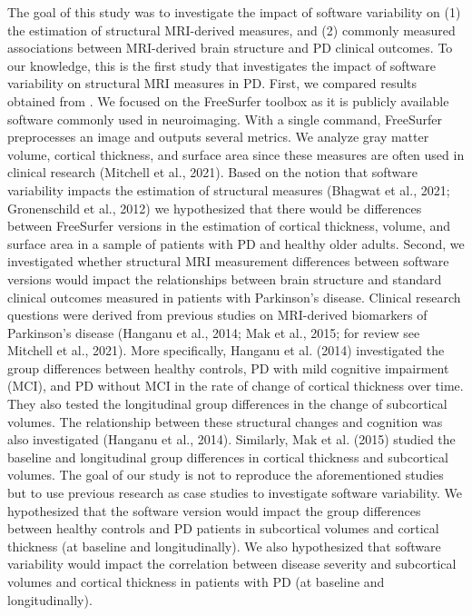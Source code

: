\documentclass[11pt]{article}
\begin{document}
The goal of this study was to investigate the impact of software variability on (1) the estimation of structural
MRI-derived measures, and (2) commonly measured associations between MRI-derived brain structure and PD clinical
outcomes. To our knowledge, this is the first study that investigates the impact of software variability on
structural MRI measures in PD. First, we compared results obtained from . We focused on the FreeSurfer toolbox as it is publicly available software commonly
used in neuroimaging. With a single command, FreeSurfer preprocesses an image and outputs several metrics. We
analyze gray matter volume, cortical thickness, and surface area since these measures are often used in clinical
research (Mitchell et al., 2021). Based on the notion that software variability impacts the estimation of
structural measures (Bhagwat et al., 2021; Gronenschild et al., 2012) we hypothesized that there would be
differences between FreeSurfer versions in the estimation of cortical thickness, volume, and surface area in a
sample of patients with PD and healthy older adults. Second, we investigated whether structural MRI measurement
differences between software versions would impact the relationships between brain structure and standard
clinical outcomes measured in patients with Parkinson's disease. Clinical research questions were derived from
previous studies on MRI-derived biomarkers of Parkinson's disease (Hanganu et al., 2014; Mak et al., 2015; for
review see Mitchell et al., 2021). More specifically, Hanganu et al. (2014) investigated the group differences
between healthy controls, PD with mild cognitive impairment (MCI), and PD without MCI in the rate of change of
cortical thickness over time. They also tested the longitudinal group differences in the change of subcortical
volumes. The relationship between these structural changes and cognition was also investigated (Hanganu et al.,
2014). Similarly, Mak et al. (2015) studied the baseline and longitudinal group differences in cortical thickness
and subcortical volumes. The goal of our study is not to reproduce the aforementioned studies but to use previous
research as case studies to investigate software variability. We hypothesized that the software version would
impact the group differences between healthy controls and PD patients in subcortical volumes and cortical
thickness (at baseline and longitudinally). We also hypothesized that software variability would impact the
correlation between disease severity and subcortical volumes and cortical thickness in patients with PD (at
baseline and longitudinally).
\end{document}
